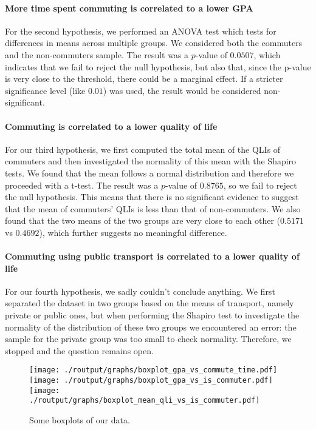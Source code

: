 \documentclass[11pt]{extarticle}
\numberwithin{table}{section}
\numberwithin{figure}{section}
\numberwithin{equation}{section}
\begin{document}
\paragraph{More time spent commuting is correlated to a lower GPA}
For the second hypothesis, we performed an ANOVA test
which tests for differences in means across multiple groups.
We considered both the commuters and the non-commuters sample.
The result was a $p$-value of $0.0507$, which indicates that we fail to reject the null hypothesis,
but also that, since the p-value is very close to the threshold, there could be a marginal effect.
If a stricter significance level (like $0.01$) was used,
the result would be considered non-significant.

\paragraph{Commuting is correlated to a lower quality of life}
For our third hypothesis, we first computed the total mean of the QLIs of commuters and
then investigated the normality of this mean with the Shapiro tests.
We found that the mean follows a normal distribution and therefore we proceeded with a t-test.
The result was a $p$-value of $0.8765$, so we fail to reject the null hypothesis.
This means that there is no significant evidence to suggest that the mean of commuters' QLIs
is less than that of non-commuters.
We also found that the two means of the two groups are very close to each other
($0.5171$ vs $0.4692$), which further suggests no meaningful difference.

\paragraph{Commuting using public transport is correlated to a lower quality of life}
For our fourth hypothesis, we sadly couldn’t conclude anything.
We first separated the dataset in two groups based on the means of transport,
namely private or public ones, but when performing the Shapiro test to investigate the normality
of the distribution of these two groups we encountered an error:
the sample for the private group was too small to check normality.
Therefore, we stopped and the question remains open.

\begin{figure}[!ht]
	\centering
	{\texttt{[image: ./routput/graphs/boxplot\_gpa\_vs\_commute\_time.pdf]}}
	{\texttt{[image: ./routput/graphs/boxplot\_gpa\_vs\_is\_commuter.pdf]}}
	{\texttt{[image: ./routput/graphs/boxplot\_mean\_qli\_vs\_is\_commuter.pdf]}}
	\caption{Some boxplots of our data.}
\end{figure}
\end{document}
